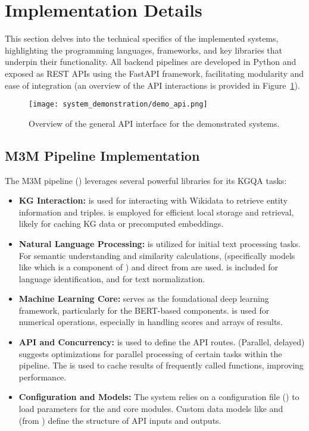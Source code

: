 \section{Implementation Details}
\label{sec:system_demos:implementation}
This section delves into the technical specifics of the implemented systems, highlighting the programming languages, frameworks, and key libraries that underpin their functionality. All backend pipelines are developed in Python and exposed as REST APIs using the FastAPI framework, facilitating modularity and ease of integration (an overview of the API interactions is provided in Figure~\ref{fig:demo_api}).

\begin{figure}[htb]
    \centering
    \texttt{[image: system\_demonstration/demo\_api.png]}
    \caption{Overview of the general API interface for the demonstrated systems.}
    \label{fig:demo_api}
\end{figure}

\subsection{M3M Pipeline Implementation}
The M3M pipeline () leverages several powerful libraries for its KGQA tasks:
\begin{itemize}
    \item \textbf{KG Interaction:}  is used for interacting with Wikidata to retrieve entity information and triples.  is employed for efficient local storage and retrieval, likely for caching KG data or precomputed embeddings.
    \item \textbf{Natural Language Processing:}  is utilized for initial text processing tasks. For semantic understanding and similarity calculations,  (specifically models like  which is a component of ) and direct  from  are used.  is included for language identification, and  for text normalization.
    \item \textbf{Machine Learning Core:}  serves as the foundational deep learning framework, particularly for the BERT-based components.  is used for numerical operations, especially in handling scores and arrays of results.
    \item \textbf{API and Concurrency:}  is used to define the API routes.  (Parallel, delayed) suggests optimizations for parallel processing of certain tasks within the pipeline. The  is used to cache results of frequently called functions, improving performance.
    \item \textbf{Configuration and Models:} The system relies on a configuration file () to load parameters for the  and  core modules. Custom data models like  and  (from ) define the structure of API inputs and outputs.
\end{itemize}

